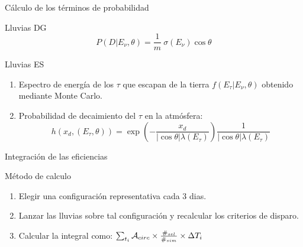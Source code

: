 % 
\begin{frame}{C\'alculo de los t\'erminos de probabilidad}
\footnotesize
 \begin{block}{Lluvias DG}
  \centering
  $$
   P(D|E_{\nu},\theta) = \frac{1}{m}~\sigma(E_{\nu})\cos\theta
   $$
 \end{block}
 
 \begin{block}{Lluvias ES}
  \begin{enumerate}
   \item Espectro de energ\'ia de los $\tau$ que escapan de la tierra $f(E_\tau|E_\nu,\theta)$ obtenido mediante Monte Carlo.
	\begin{center}
	\end{center}
   \item Probabilidad de decaimiento del $\tau$ en la atm\'osfera:
   \begin{displaymath}
    h(x_d,(E_\tau,\theta))=
		\exp{\left(
		-\frac{x_d}{|\cos\theta|\lambda(E_\tau)}
		\right)}
		\frac{1}{|\cos\theta|\lambda(E_\tau)}
   \end{displaymath}
  \end{enumerate}
 \end{block}
\end{frame}

\begin{frame}{Integraci\'on de las eficiencias}
	\begin{block}{M\'etodo de calculo}
	\begin{enumerate}
	 \item Elegir una configuraci\'on representativa cada 3 dias.
	 \item Lanzar las lluvias sobre tal configuraci\'on y recalcular los criterios de disparo.
	 
	 \begin{center}  
	 \end{center}
	 \item Calcular la integral como: $\sum_{t_i} {\cal A}_{circ} \times \frac{\#_{sel}}{\#_{sim}} \times \Delta T_i$
	\end{enumerate}

	\end{block}
% 		
\end{frame}

